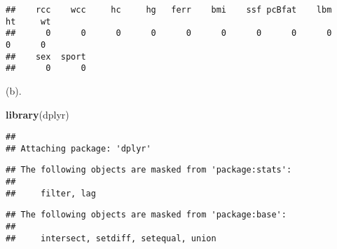 \documentclass[
]{article}
\newenvironment{Shaded}{\begin{snugshade}}{\end{snugshade}}
\newcommand{\FunctionTok}[1]{\textcolor[rgb]{0.13,0.29,0.53}{\textbf{#1}}}
\newcommand{\NormalTok}[1]{#1}
\begin{document}
\begin{verbatim}
##    rcc    wcc     hc     hg   ferr    bmi    ssf pcBfat    lbm     ht     wt 
##      0      0      0      0      0      0      0      0      0      0      0 
##    sex  sport 
##      0      0
\end{verbatim}

(b).

\begin{Shaded}
\begin{Highlighting}[]
\FunctionTok{library}\NormalTok{(dplyr)}
\end{Highlighting}
\end{Shaded}

\begin{verbatim}
## 
## Attaching package: 'dplyr'
\end{verbatim}

\begin{verbatim}
## The following objects are masked from 'package:stats':
## 
##     filter, lag
\end{verbatim}

\begin{verbatim}
## The following objects are masked from 'package:base':
## 
##     intersect, setdiff, setequal, union
\end{verbatim}
\end{document}
